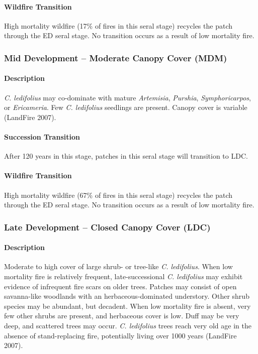 \paragraph{Wildfire Transition} High mortality wildfire (17\% of fires in this seral stage) recycles the patch through the ED seral stage. No transition occurs as a result of low mortality fire.

\noindent\hrulefill


\subsubsection{Mid Development – Moderate Canopy Cover (MDM)}

\paragraph{Description} \emph{C. ledifolius} may co-dominate with mature \emph{Artemisia}, \emph{Purshia}, \emph{Symphoricarpos}, or \emph{Ericameria}. Few \emph{C. ledifolius} seedlings are present. Canopy cover is variable (LandFire 2007).

\paragraph{Succession Transition} After 120 years in this stage, patches in this seral stage will transition to LDC.

\paragraph{Wildfire Transition} High mortality wildfire (67\% of fires in this seral stage) recycles the patch through the ED seral stage. No transition occurs as a result of low mortality fire.

\noindent\hrulefill


\subsubsection{Late Development – Closed Canopy Cover (LDC)}

\paragraph{Description} Moderate to high cover of large shrub- or tree-like \emph{C. ledifolius}. When low mortality fire is relatively frequent, late-successional \emph{C. ledifolius} may exhibit evidence of infrequent fire scars on older trees. Patches may consist of open savanna-like woodlands with an herbaceous-dominated understory. Other shrub species may be abundant, but decadent. When low mortality fire is absent, very few other shrubs are present, and herbaceous cover is low. Duff may be very deep, and scattered trees may occur. \emph{C. ledifolius} trees reach very old age in the absence of stand-replacing fire, potentially living over 1000 years (LandFire 2007).

